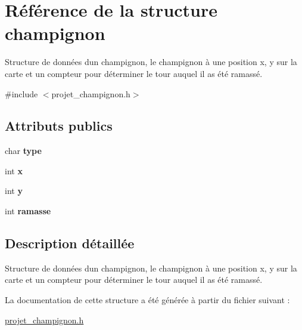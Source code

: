 \hypertarget{structchampignon}{}\section{Référence de la structure champignon}
\label{structchampignon}


Structure de données d\textquotesingle{}un champignon, le champignon à une position x, y sur la carte et un compteur pour déterminer le tour auquel il as été ramassé.  




{\ttfamily \#include $<$projet\+\_\+champignon.\+h$>$}

\subsection*{Attributs publics}
\begin{DoxyCompactItemize}
\item 
\mbox{\label{structchampignon_aed63571ad4e8a8fb84e27398c7654189}} 
char {\bfseries type}
\item 
\mbox{\label{structchampignon_a9a2b2022043a8c79445094cb07ae096c}} 
int {\bfseries x}
\item 
\mbox{\label{structchampignon_a0febfe77078d4d9c495937b24da47ea3}} 
int {\bfseries y}
\item 
\mbox{\label{structchampignon_aa3293013f3ad679d31612b2c34c049b4}} 
int {\bfseries ramasse}
\end{DoxyCompactItemize}


\subsection{Description détaillée}
Structure de données d\textquotesingle{}un champignon, le champignon à une position x, y sur la carte et un compteur pour déterminer le tour auquel il as été ramassé. 

La documentation de cette structure a été générée à partir du fichier suivant \+:\begin{DoxyCompactItemize}
\item 
\hyperlink{projet__champignon_8h}{projet\+\_\+champignon.\+h}\end{DoxyCompactItemize}
